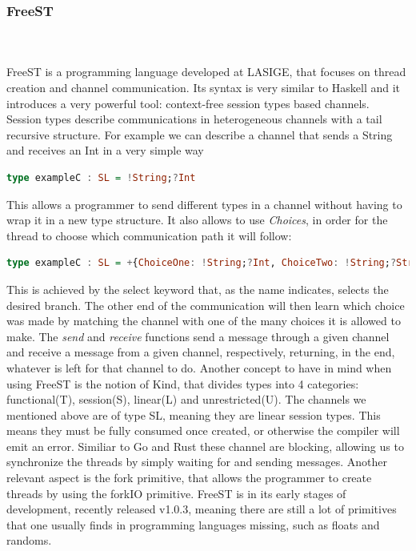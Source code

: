 \documentclass[runningheads]{llncs}
\begin{document}
\subsubsection{FreeST}\hfill\\\\
FreeST is a programming language developed at LASIGE, that focuses on thread creation and channel communication. Its syntax is very similar to Haskell and it introduces a very powerful tool: context-free session types based channels.\\
Session types describe communications in heterogeneous channels with a tail recursive structure\cite{session}.
For example we can describe a channel that sends a String and receives an Int in a very simple way
\begin{lstlisting}[language=haskell]
type exampleC : SL = !String;?Int
\end{lstlisting}
This allows a programmer to send different types in a channel without having to wrap it in a new type structure.
It also allows to use {\it Choices}, in order for the thread to choose which communication path it will follow:
\begin{lstlisting}[language=haskell]
type exampleC : SL = +{ChoiceOne: !String;?Int, ChoiceTwo: !String;?String}
\end{lstlisting}
This is achieved by the select keyword that, as the name indicates, selects the desired branch. The other end of the communication will then learn which choice was made by matching the channel with one of the many choices it is allowed to make.
The {\it send} and {\it receive} functions send a message through a given channel and receive a message from a given channel, respectively, returning, in the end, whatever is left for that channel to do.
Another concept to have in mind when using FreeST is the notion of Kind, that divides types into 4 categories:
functional(T), session(S), linear(L) and unrestricted(U).
The channels we mentioned above are of type SL, meaning they are linear session types. This means they must be fully consumed once created, or otherwise the compiler will emit an error.
Similiar to Go and Rust these channel are blocking, allowing us to synchronize the threads by simply waiting for and sending messages.
Another relevant aspect is the fork primitive, that allows the programmer to create threads by using the forkIO primitive\cite{freest}.
FreeST is in its early stages of development, recently released v1.0.3, meaning there are still a lot of primitives that one usually finds in programming languages missing, such as floats and randoms.
\end{document}
